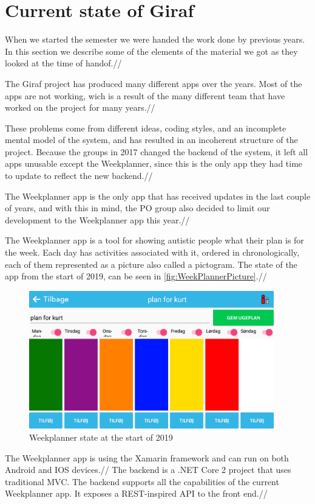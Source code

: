 \section{Current state of Giraf}

When we started the semester we were handed the work done by previous years. In this section we describe some of the elements of the material we got as they looked at the time of handof.//

The Giraf project has produced many different apps over the years. Most of the apps are not working, wich is a result of the many different team that have worked on the project for many years.//

These problems come from different ideas, coding styles, and an incomplete mental model of the system, and has resulted in an incoherent structure of the project. Because the groups in 2017 \cite{SW608F18} changed the backend of the system, it left all apps unusable except the Weekplanner, since this is the only app they had time to update to reflect the new backend.//

The Weekplanner app is the only app that has received updates in the last couple of years, and with this in mind, the \gls{PO} group also decided to limit our development to the Weekplanner app this year.//

The Weekplanner app is a tool for showing autistic people what their plan is for the week. Each day has activities associated with it, ordered in chronologically, each of them represented as a picture also called a pictogram. The state of the app from the start of 2019, can be seen in \autoref{fig:WeekPlannerPicture}.//

\begin{figure}[ht]
        \begin{center}
            \includegraphics[width=0.95\textwidth]{figures/WeekPlannerPicture}
        \end{center}
        \caption{Weekplanner state at the start of 2019}
        \label{fig:WeekPlannerPicture}
\end{figure}

The Weekplanner app is using the Xamarin framework and can run on both Android and IOS devices.//
The backend is a .NET Core 2 project that uses traditional MVC. The backend supports all the capabilities of the current Weekplanner app. It exposes a REST-inspired API to the front end.//